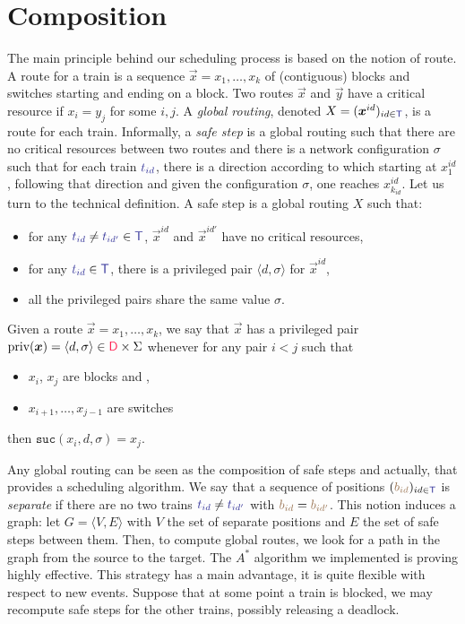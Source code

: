 \documentclass[runningheads]{llncs}
\newcommand{\directions}{\dirFmt{\mathsf{D}}}
\newcommand{\sucblock}{{\mathtt{suc}}}
\newcommand{\dirFmt}[1]{{\color{dircolor} #1}}
\newcommand{\posFmt}[1]{{\color{poscolor}{#1}}}
\newcommand{\bid}[1]{\ensuremath{\posFmt{b_{#1}}}}
\newcommand{\trainFmt}[1]{{\color{traincolor} #1}}
\newcommand{\trains}{{\trainFmt{\mathsf{T}}}}
\newcommand{\tid}[1]{\ensuremath{\trainFmt{t_{#1}}}}
\begin{document}
\section{Composition}
\label{sec:composition}

The main principle behind our scheduling process is based on the notion of route. A route for a train is a sequence $\vec{x} = x_1, \ldots, x_k$ of (contiguous) blocks and switches starting and ending on a block.   Two routes $\vec{x}$ and $\vec{y}$ have a critical resource if  $x_i = y_j$ for some $i,j$. A \emph{global routing}, denoted $X = (\vec{x}^{id})_{id \in \trains}$,  is a route for each train. Informally, a \emph{safe step} is a global routing such that there are no critical resources between two routes and there is a network configuration $\sigma$ such that  for each train $\tid{id}$, there is a direction according to which starting at $x_1^{id}$, following that direction and given the configuration $\sigma$, one reaches $x_{k_{id}}^{id}$. Let us turn to the technical definition.   A safe step is a global routing $X$ such that:
\begin{itemize}
\item for any $\tid{id} \neq \tid{id'} \in \trains$, $\vec{x}^{id}$ and $\vec{x}^{id'}$ have no critical resources,
\item for any $\tid{id} \in \trains$, there is a privileged pair $\langle d, \sigma\rangle$  for $\vec{x}^{id}$,
\item all the privileged pairs share the same value $\sigma$. 
\end{itemize}

Given a route $\vec{x} = x_1, \ldots, x_k$, we say that $\vec{x}$ has a privileged pair $\text{priv}(\vec{x}) = \langle d, \sigma\rangle \in \directions \times \Sigma$ whenever for any pair $i < j$ such that
\begin{itemize}
\item  $x_i$, $x_j$ are blocks and  , 
\item $x_{i+1}, \ldots, x_{j-1}$ are switches
\end{itemize} 
then  $\sucblock(x_i, d, \sigma) = x_j$.


Any global routing can be seen as the composition of safe steps and actually, that provides a scheduling algorithm. We say that a sequence of positions $(\bid{id})_{id \in \trains}$ is \emph{separate} if there are no two trains $\tid{id} \neq \tid{id'}$ with $\bid{id} = \bid{id'}$. This notion induces a graph: let $G = \langle V, E\rangle$ with $V$ the set of separate positions and $E$ the set of safe steps between them.  Then, to compute global routes, we look for a path in the graph from the source to the target. The  $A^*$ algorithm we implemented is proving highly effective. This strategy has a main advantage, it is quite flexible with respect to new events. Suppose that at some point a train is blocked, we may recompute safe steps for the other trains, possibly releasing a deadlock. 
\end{document}
